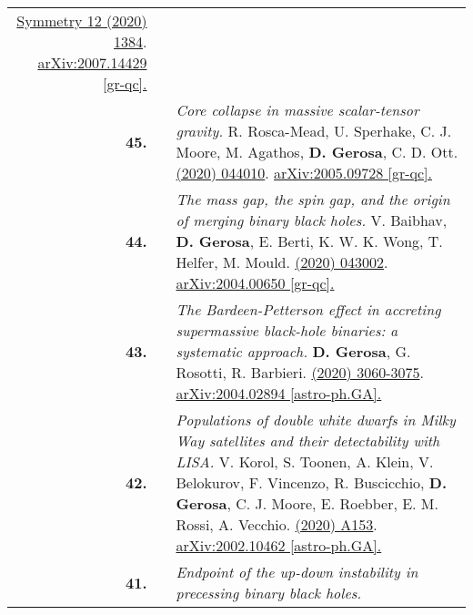 {\begin{longtable}{rp{0.3cm}p{15.8cm}}
\href{https://www.mdpi.com/2073-8994/12/9/1384}{Symmetry 12 (2020) 1384}. \href{https://arxiv.org/abs/2007.14429}{arXiv:2007.14429 [gr-qc].}
\vspace{0.09cm}\\
%
\textbf{45.} & & \textit{Core collapse in massive scalar-tensor gravity.}
\newline{}
R. Rosca-Mead, U. Sperhake, C. J. Moore, M. Agathos, \textbf{D. Gerosa}, C. D. Ott.
\newline{}
\href{https://journals.aps.org/prd/abstract/10.1103/PhysRevD.102.044010}{\prd 102 (2020) 044010}. \href{https://arxiv.org/abs/2005.09728}{arXiv:2005.09728 [gr-qc].}
\vspace{0.09cm}\\
%
\textbf{44.} & & \textit{The mass gap, the spin gap, and the origin of merging binary black holes.}
\newline{}
V. Baibhav, \textbf{D. Gerosa}, E. Berti, K. W. K. Wong, T. Helfer, M. Mould.
\newline{}
\href{https://journals.aps.org/prd/abstract/10.1103/PhysRevD.102.043002}{\prd 102 (2020) 043002}. \href{https://arxiv.org/abs/2004.00650}{arXiv:2004.00650 [gr-qc].}
\vspace{0.09cm}\\
%
\textbf{43.} & & \textit{The Bardeen-Petterson effect in accreting supermassive black-hole binaries: a systematic approach.}
\newline{}
\textbf{D. Gerosa}, G. Rosotti, R. Barbieri.
\newline{}
\href{https://doi.org/10.1093/mnras/staa1693}{\mnras 496 (2020) 3060-3075}. \href{https://arxiv.org/abs/2004.02894}{arXiv:2004.02894 [astro-ph.GA].}
\vspace{0.09cm}\\
%
\textbf{42.} & & \textit{Populations of double white dwarfs in Milky Way satellites and their detectability with LISA.}
\newline{}
V. Korol, S. Toonen, A. Klein, V. Belokurov, F. Vincenzo, R. Buscicchio, \textbf{D. Gerosa}, C. J. Moore, E. Roebber, E. M. Rossi, A. Vecchio.
\newline{}
\href{https://www.aanda.org/articles/aa/abs/2020/06/aa37764-20/aa37764-20.html}{\aap 638 (2020) A153}. \href{https://arxiv.org/abs/2002.10462}{arXiv:2002.10462 [astro-ph.GA].}
\vspace{0.09cm}\\
%
\textbf{41.} & & \textit{Endpoint of the up-down instability in precessing binary black holes.}
\newline{}

\end{longtable}}
